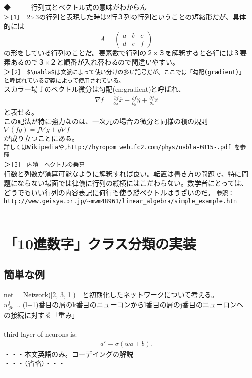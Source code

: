 \documentclass[11pt,a4paper,fleqn]{jsarticle}
\begin{document}
◆---------行列式とベクトル式の意味がわからん-----------------------------------------\\
\verb|＞[1]|　2×3の行列と表現した時は2行３列の行列ということの短縮形だが、具体的には\\
\[
  A = \left(
    \begin{array}{ccc}
      a & b & c \\
      d & e & f 
    \end{array}
  \right)
\]
の形をしている行列のことだ。要素数で行列の２×３を解釈すると各行には３要素あるので３×２と順番が入れ替わるので間違いやすい。\\
＞\verb|[2]　$\nabla$は文脈によって使い分けの多い記号だが、ここでは「勾配(gradient)」と呼ばれている定義によって使用されている。|\\
スカラー場 f のベクトル微分は勾配(en:gradient)と呼ばれ、\\
\begin{eqnarray}
\nabla f = \frac{\partial f}{\partial x}\hat{x} + \frac{\partial f}{\partial y}\hat{y} + \frac{\partial f}{\partial z}\hat{z} \nonumber
\end{eqnarray}
と表せる。\\
この記法が特に強力なのは、一次元の場合の微分と同様の積の規則\\
$\nabla (fg) = f\nabla g + g\nabla f$\\
が成り立つことにある。\\
\verb|詳しくはWikipediaや,http://hyropom.web.fc2.com/phys/nabla-0815-.pdf を参照|\\
＞\verb|[3]　内積　ヘクトルの乗算|\\
行数と列数が演算可能なように解釈すれば良い。転置は書き方の問題で、特に問題にならない場面では律儀に行列の縦横にはこだわらない。数学者にとっては、どうでもいい行列の内容表記に何行も使う縦ベクトルはうざいのだ。
\verb|参照：http://www.geisya.or.jp/~mwm48961/linear_algebra/simple_example.htm|
-----------------------------------------------------------------------------------------\\
\section{「10進数字」クラス分類の実装}
\subsection{簡単な例}
net = Network([2, 3, 1])　と初期化したネットワークについて考える。\\
$w^l_{jk}$ … (l−1)番目の層のk番目のニューロンからl番目の層のj番目のニューロンへの接続に対する「重み」\\
\\
third layer of neurons is:
\begin{eqnarray}
  a' = \sigma(w a + b).
\end{eqnarray}
・・・本文英語のみ。コーデイングの解説\\
・・・（省略）・・・\\
-------------------------------------------------------------------------------------------\\
\\
\newpage
\end{document}
